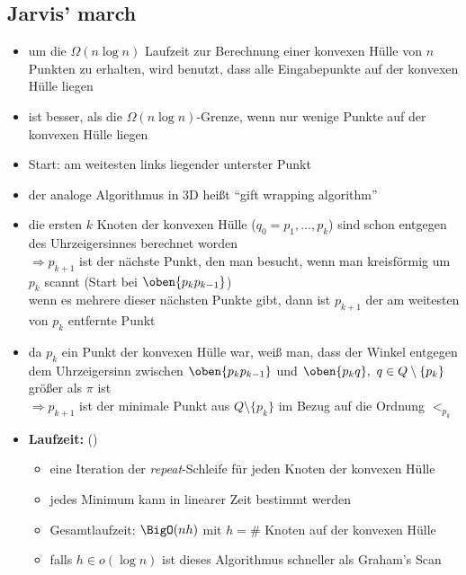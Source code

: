 \subsection{Jarvis' march}
\begin{itemize}[itemsep=0pt]
	\item um die $\Omega(n\log n)$ Laufzeit zur Berechnung einer konvexen Hülle von $n$ Punkten zu erhalten, wird benutzt, dass alle Eingabepunkte auf der konvexen Hülle liegen
	\item ist besser, als die $\Omega(n\log n)$-Grenze, wenn nur wenige Punkte auf der konvexen Hülle liegen
	\item Start: am weitesten links liegender unterster Punkt
	\item der analoge Algorithmus in 3D heißt ``gift wrapping algorithm''
	\item die ersten $k$ Knoten der konvexen Hülle ($q_0=p_1,\dots,p_k$) sind schon entgegen des Uhrzeigersinnes berechnet worden\\
	$\Rightarrow p_{k+1}$ ist der nächste Punkt, den man besucht, wenn man kreisförmig um $p_k$ scannt (Start bei $\oben{p_kp_{k-1}}$)\\
	wenn es mehrere dieser nächsten Punkte gibt, dann ist $p_{k+1}$ der am weitesten von $p_k$ entfernte Punkt
	\item da $p_k$ ein Punkt der konvexen Hülle war, weiß man, dass der Winkel entgegen dem Uhrzeigersinn zwischen $\oben{p_kp_{k-1}}$ und $\oben{p_kq},~q\in Q\setminus \{p_k\}$ größer als $\pi$ ist\\
	$\Rightarrow p_{k+1}$ ist der minimale Punkt aus $Q\setminus \{p_k\}$ im Bezug auf die Ordnung $<_{p_k}$
	\item \textbf{Laufzeit:} ()
		\begin{itemize}
			\item eine Iteration der \textit{repeat}-Schleife für jeden Knoten der konvexen Hülle
			\item jedes Minimum kann in linearer Zeit bestimmt werden
			\item Gesamtlaufzeit: $\BigO(nh)$ mit $h = \#$ Knoten auf der konvexen Hülle
			\item falls $h\in o(\log n)$ ist dieses Algorithmus schneller als Graham's Scan
		\end{itemize}
\end{itemize}